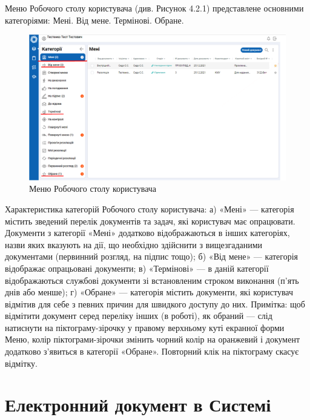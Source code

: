 Меню Робочого столу користувача (див. Рисунок 4.2.1) представлене основними
категоріями: Мені. Від мене. Термінові. Обране.

\begin{figure}[!htbp]
\centerline{\includegraphics[width=\textwidth]{img/4.2.1.png}}
\caption{Меню Робочого столу користувача}
\end{figure}

Характеристика категорій Робочого столу користувача:
 а) «Мені» --- категорія містить зведений перелік документів та задач, які
користувач має опрацювати. Документи з категорії «Мені» додатково
відображаються в інших категоріях, назви яких вказують на дії, що необхідно
здійснити з вищезгаданими документами (первинний розгляд, на підпис тощо);
 б) «Від мене» --- категорія відображає опрацьовані документи;
 в) «Термінові» --- в даній категорії відображаються службові документи зі
встановленим строком виконання (п’ять днів або менше);
 г) «Обране» --- категорія містить документи, які користувач відмітив для себе
з певних причин для швидкого доступу до них.
 Примітка: щоб відмітити документ серед переліку інших (в роботі), як обраний ---
слід натиснути на піктограму-зірочку у правому верхньому куті екранної форми Меню,
колір піктограми-зірочки змінить чорний колір на оранжевий і документ додатково
з’явиться в категорії «Обране». Повторний клік на піктограму скасує відмітку.

\section{Електронний документ в Системі}

